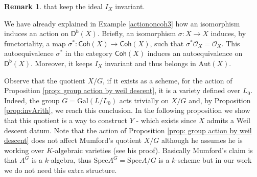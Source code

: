 \documentclass[10pt]{amsart}
\theoremstyle{definition}
\newtheorem{remark}[theorem]{Remark}
\newcommand{\Spe}{ {\mathrm{Spec} } }
\newcommand{\A}{{ \mathrm{Aut} }}
\newcommand{\Gal}{{ \mathrm{Gal}}}
\begin{document}
\begin{remark}
that keep the ideal $I_X$ invariant. 

We have already explained in Example \ref{actiononcoh3} how an isomorphism induces an action on $\mathsf{D^b}(X)$.
Briefly, an isomorphism $\sigma \colon X \rightarrow X$ induces, by functoriality, a map $\sigma^* \colon\mathsf{Coh}(X) \rightarrow \mathsf{Coh}(X)$, such that  $\sigma^*\mathcal{O}_X = \mathcal{O}_X$. This autoequivalence  $\sigma^*$ in the category $\mathsf{Coh}(X)$ induces an autoequivalence on $\mathsf{D^b}(X)$. Moreover, it keeps $I_X$ invariant and thus belongs in $\A (X)$.
\end{remark}

Observe that the quotient $X/G$, if it exists as a scheme, for the action of Proposition \ref{prop: group action by weil descent}, it is a variety defined over $L_0$. Indeed, the group $G=\Gal(L/L_0)$ acts trivially on $X/G$ and, by Proposition \ref{prop:invArith}, we reach this conclusion. In the following proposition we show that this quotient is a way to construct $Y$ - which exists since $X$ admits a Weil descent datum.
Note that the action of Proposition \ref{prop: group action by weil descent} does not affect Mumford's quotient $X/G$ although he assumes he is working over $K$-algebraic varieties (see his proof). Basically Mumford's claim is that $A^G$ is a $k$-algebra, thus $\Spe A^G = \Spe A /G$ is a $k$-scheme but in our work we do not need this extra structure.
\end{document}
